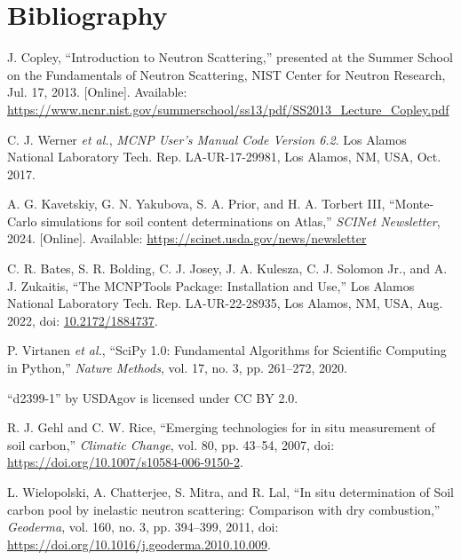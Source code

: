 \documentclass[xcolor=dvipsnames,envcountsect]{beamer}
\begin{document}
\section{Bibliography}
\begin{frame}[allowframebreaks]
  \begin{thebibliography}{11}

    J. Copley, ``Introduction to Neutron Scattering,'' presented at the Summer School on the Fundamentals of Neutron Scattering, NIST Center for Neutron Research, Jul. 17, 2013. [Online]. Available: \url{https://www.ncnr.nist.gov/summerschool/ss13/pdf/SS2013_Lecture_Copley.pdf}
    
    C. J. Werner \textit{et al.}, \textit{MCNP User's Manual Code Version 6.2}. Los Alamos National Laboratory Tech. Rep. LA-UR-17-29981, Los Alamos, NM, USA, Oct. 2017.
    
    A. G. Kavetskiy, G. N. Yakubova, S. A. Prior, and H. A. Torbert III, ``Monte-Carlo simulations for soil content determinations on Atlas,'' \textit{SCINet Newsletter}, 2024. [Online]. Available: \url{https://scinet.usda.gov/news/newsletter}
    
    C. R. Bates, S. R. Bolding, C. J. Josey, J. A. Kulesza, C. J. Solomon Jr., and A. J. Zukaitis, ``The MCNPTools Package: Installation and Use,'' Los Alamos National Laboratory Tech. Rep. LA-UR-22-28935, Los Alamos, NM, USA, Aug. 2022, doi: \url{10.2172/1884737}.
    
    P. Virtanen \textit{et al.}, ``SciPy 1.0: Fundamental Algorithms for Scientific Computing in Python,'' \textit{Nature Methods}, vol. 17, no. 3, pp. 261--272, 2020.
    
    ``d2399-1'' by USDAgov is licensed under CC BY 2.0.
    
    R. J. Gehl and C. W. Rice, ``Emerging technologies for in situ measurement of soil carbon,'' \textit{Climatic Change}, vol. 80, pp. 43--54, 2007, doi: \url{https://doi.org/10.1007/s10584-006-9150-2}.
    
    L. Wielopolski, A. Chatterjee, S. Mitra, and R. Lal, ``In situ determination of Soil carbon pool by inelastic neutron scattering: Comparison with dry combustion,'' \textit{Geoderma}, vol. 160, no. 3, pp. 394--399, 2011, doi: \url{https://doi.org/10.1016/j.geoderma.2010.10.009}.
    

\end{thebibliography}
\end{frame}
\end{document}
